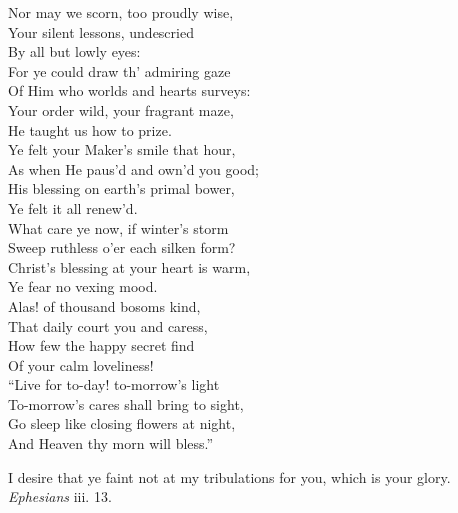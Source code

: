  Nor may we scorn, too proudly wise, \\
 Your silent lessons, undescried \\
 By all but lowly eyes: \\
 For ye could draw th’ admiring gaze \\
 Of Him who worlds and hearts surveys: \\
 Your order wild, your fragrant maze, \\
 He taught us how to prize. \\
  Ye felt your Maker’s smile that hour, \\
 As when He paus’d and own’d you good; \\
 His blessing on earth’s primal bower, \\
 Ye felt it all renew’d. \\
 What care ye now, if winter’s storm \\
 Sweep ruthless o’er each silken form? \\
 Christ’s blessing at your heart is warm, \\
 Ye fear no vexing mood. \\
  Alas! of thousand bosoms kind, \\
 That daily court you and caress, \\
 How few the happy secret find \\
 Of your calm loveliness! \\
 “Live for to-day! to-morrow’s light \\
 To-morrow’s cares shall bring to sight, \\
 Go sleep like closing flowers at night, \\
 And Heaven thy morn will bless.”\\


I desire that ye faint not at my tribulations for you, which is your glory. \emph{Ephesians} iii. 13.

